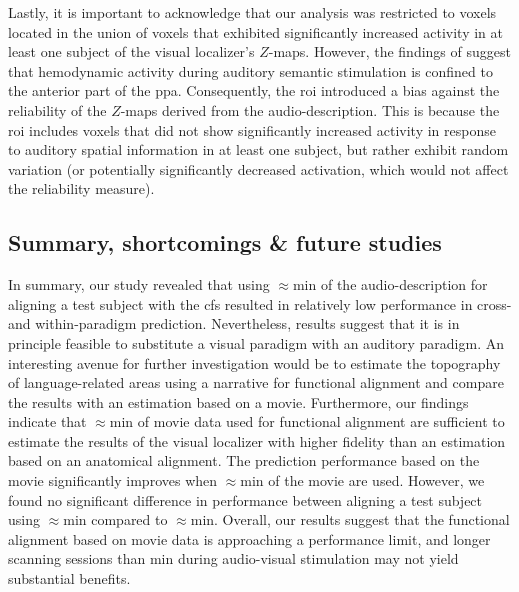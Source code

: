 
%
Lastly, it is important to acknowledge that our analysis was restricted to
voxels located in the union of voxels that exhibited significantly increased
activity in at least one subject of the visual localizer's $Z$-maps.
%
However, the findings of \citet{haeusler2022processing} suggest that hemodynamic
activity during auditory semantic stimulation is confined to the anterior part
of the \ac{ppa}.
%
Consequently, the \ac{roi} introduced a bias against the reliability of the
$Z$-maps derived from the audio-description.
%
This is because the \ac{roi} includes voxels that did not show significantly
increased activity in response to auditory spatial information in at least one
subject, but rather exhibit random variation (or potentially significantly
decreased activation, which would not affect the reliability measure).


\subsection{Summary, shortcomings \& future studies}

%
In summary, our study revealed that using $\approx$\unit[15]{min} of the
audio-description for aligning a test subject with the \ac{cfs} resulted in
relatively low performance in cross- and within-paradigm prediction.
%
Nevertheless, results suggest that it is in principle feasible to substitute a
visual paradigm with an auditory paradigm.
%
An interesting avenue for further investigation would be to estimate the
topography of language-related areas using a narrative for functional alignment
and compare the results with an estimation based on a movie.
%
Furthermore, our findings indicate that $\approx$\unit[15]{min} of movie data
used for functional alignment are sufficient to estimate the results of the
visual localizer with higher fidelity than an estimation based on an anatomical
alignment.
%
The prediction performance based on the movie significantly improves when
$\approx$\unit[30]{min} of the movie are used.
%
However, we found no significant difference in performance between aligning a
test subject using $\approx$\unit[45]{min} compared to $\approx$\unit[30]{min}.
%
Overall, our results suggest that the functional alignment based on movie data
is approaching a performance limit, and longer scanning sessions than
\unit[30]{min} during audio-visual stimulation may not yield substantial
benefits.

